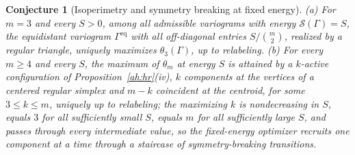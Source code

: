 \documentclass[11pt]{article}
\newtheorem{conjecture}{Conjecture}
\theoremstyle{definition}
\begin{document}
\begin{conjecture}[Isoperimetry and symmetry breaking at fixed energy]\label{ah1}
(a) For $m=3$ and every $S>0$, among all admissible variograms with energy $\mathcal S(\Gamma)=S$, the equidistant variogram $\Gamma^{\mathrm{eq}}$ with all off-diagonal entries $S/\binom m2$, realized by a regular triangle, uniquely maximizes $\theta_3(\Gamma)$, up to relabeling.  (b) For every $m\ge4$ and every $S$, the maximum of $\theta_m$ at energy $S$ is attained by a $k$-active configuration of Proposition~\ref{ah:hr}(iv), $k$ components at the vertices of a centered regular simplex and $m-k$ coincident at the centroid, for some $3\le k\le m$, uniquely up to relabeling; the maximizing $k$ is nondecreasing in $S$, equals $3$ for all sufficiently small $S$, equals $m$ for all sufficiently large $S$, and passes through every intermediate value, so the fixed-energy optimizer recruits one component at a time through a staircase of symmetry-breaking transitions.
\end{conjecture}
\end{document}
